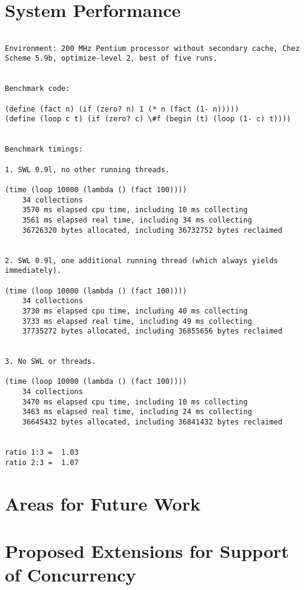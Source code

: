 \documentclass{article}
\begin{document}
\section{System Performance}

\begin{verbatim}

Environment: 200 MHz Pentium processor without secondary cache, Chez
Scheme 5.9b, optimize-level 2, best of five runs.


Benchmark code:

(define (fact n) (if (zero? n) 1 (* n (fact (1- n)))))
(define (loop c t) (if (zero? c) \#f (begin (t) (loop (1- c) t))))


Benchmark timings:

1. SWL 0.9l, no other running threads.

(time (loop 10000 (lambda () (fact 100))))
    34 collections
    3570 ms elapsed cpu time, including 10 ms collecting
    3561 ms elapsed real time, including 34 ms collecting
    36726320 bytes allocated, including 36732752 bytes reclaimed


2. SWL 0.9l, one additional running thread (which always yields 
immediately).

(time (loop 10000 (lambda () (fact 100))))
    34 collections
    3730 ms elapsed cpu time, including 40 ms collecting
    3733 ms elapsed real time, including 49 ms collecting
    37735272 bytes allocated, including 36855656 bytes reclaimed


3. No SWL or threads.

(time (loop 10000 (lambda () (fact 100))))
    34 collections
    3470 ms elapsed cpu time, including 10 ms collecting
    3463 ms elapsed real time, including 24 ms collecting
    36645432 bytes allocated, including 36841432 bytes reclaimed


ratio 1:3 =  1.03
ratio 2:3 =  1.07

\end{verbatim}


\section{Areas for Future Work}


\section{Proposed Extensions for Support of Concurrency}
\end{document}
